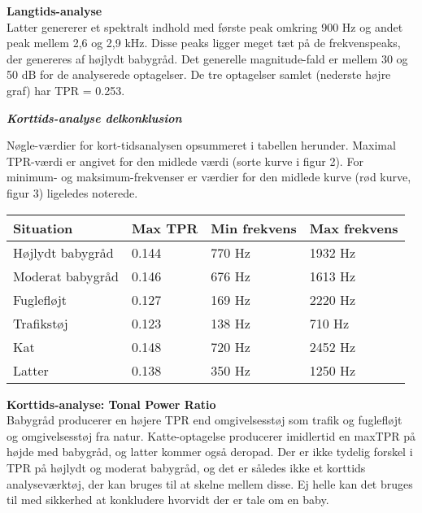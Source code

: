 
\newpage
\textbf{Langtids-analyse} \\
Latter genererer et spektralt indhold med første peak omkring 900 Hz og andet peak mellem 2,6 og 2,9 kHz. Disse peaks ligger meget tæt på de frekvenspeaks, der genereres af højlydt babygråd. Det generelle magnitude-fald er mellem 30 og 50 dB for de analyserede optagelser. De tre optagelser samlet (nederste højre graf) har TPR = 0.253.



\newpage
\begin{center} \textit{\textbf{Korttids-analyse delkonklusion}} \end{center}
Nøgle-værdier for kort-tidsanalysen opsummeret i tabellen herunder. Maximal TPR-værdi er angivet for den midlede værdi (sorte kurve i figur 2). For minimum- og maksimum-frekvenser er værdier for den midlede kurve (rød kurve, figur 3) ligeledes noterede.

\begin{center}
    \begin{tabular}{ | l | l | l | l |}
    \hline
    \textbf{Situation} 	& \textbf{Max TPR}  &\textbf{Min frekvens}	&\textbf{Max frekvens}  	\\ \hline
    Højlydt babygråd 	& 0.144   				&770 Hz 				&1932 Hz				\\ \hline
    Moderat babygråd 	& 0.146  				&676 Hz 				&1613 Hz				\\ \hline
    Fuglefløjt 			& 0.127  				&169 Hz 				&2220 Hz				\\ \hline	
    Trafikstøj 			& 0.123  				&138 Hz 				&710 Hz					\\ \hline
    Kat 				& 0.148  				&720 Hz					&2452 Hz				\\ \hline
    Latter 				& 0.138  				&350 Hz					&1250 Hz				\\ \hline
    \end{tabular}
\end{center}

\textbf{Korttids-analyse: Tonal Power Ratio}	\\
Babygråd producerer en højere TPR end omgivelsesstøj som trafik og fuglefløjt og omgivelsesstøj fra natur. Katte-optagelse producerer imidlertid en maxTPR på højde med babygråd, og latter kommer også deropad. Der er ikke tydelig forskel i TPR på højlydt og moderat babygråd, og det er således ikke et korttids analyseværktøj, der kan bruges til at skelne mellem disse. Ej helle kan det bruges til med sikkerhed at konkludere hvorvidt der er tale om en baby.


